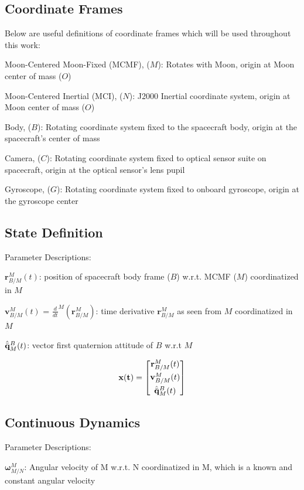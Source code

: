 \documentclass[conf]{new-aiaa}
\newcommand{\vect}[1]{\mathbf{#1}}
\newcommand{\rBM}{\vect{r}^M_{B/M}}      %
\newcommand{\vBM}{\vect{v}^M_{B/M}}      %
\newcommand{\qBM}{\hat{\Bar{\mathbf{q}}}^B_{M}}    %
\newcommand{\wMN}{\vect{\omega}^M_{M/N}}
\begin{document}
\subsection{Coordinate Frames}

Below are useful definitions of coordinate frames which will be used throughout this work:

Moon-Centered Moon-Fixed (MCMF), ($M$): Rotates with Moon, origin at Moon center of mass ($O$)

Moon-Centered Inertial (MCI), ($N$): J2000 Inertial coordinate system, origin at Moon center of mass ($O$)

Body, ($B$): Rotating coordinate system fixed to the spacecraft body, origin at the spacecraft's center of mass

Camera, ($C$): Rotating coordinate system fixed to optical sensor suite on spacecraft, origin at the optical sensor's lens pupil

Gyroscope, ($G$): Rotating coordinate system fixed to onboard gyroscope, origin at the gyroscope center


\subsection{State Definition}

Parameter Descriptions:


$\rBM(t)$: position of spacecraft body frame ($B$) w.r.t. MCMF ($M$) coordinatized in $M$


$\vBM(t)$ = $\frac{d}{dt}^M(\rBM)$: time derivative $\rBM$ as seen from $M$ coordinatized in $M$


$\qBM(t)$: vector first quaternion attitude of $B$ w.r.t $M$

\begin{equation}
\vect{x(t)} =
\begin{bmatrix}
\rBM(t) \\[4pt]
\vBM(t) \\[4pt]
\qBM(t)
\end{bmatrix}
\label{eq:StateDef}
\end{equation}





\subsection{Continuous Dynamics}
Parameter Descriptions:

$\wMN$: Angular velocity of M w.r.t. N coordinatized in M, which is a known and constant angular velocity
\end{document}
